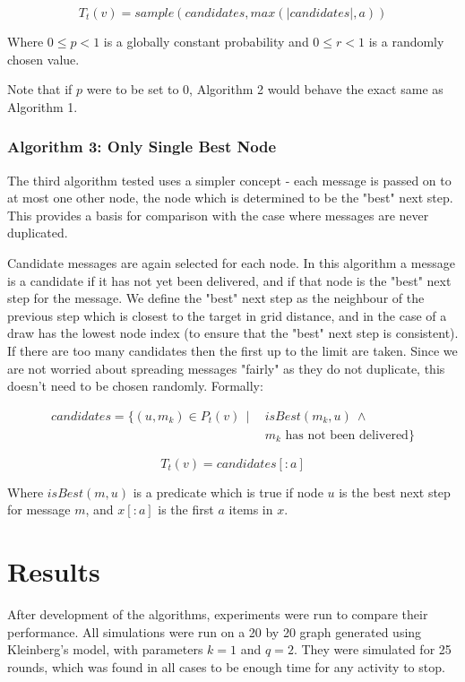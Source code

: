 \documentclass[bsc,frontabs,twoside,singlespacing,parskip,deptreport]{infthesis}     %
\begin{document}
\begin{equation}
T_{t}(v) = sample(candidates, max(|candidates|, a))
\end{equation}

Where $0 \leq p < 1$ is a globally constant probability and $0 \leq r < 1$ is a randomly chosen value.

Note that if $p$ were to be set to 0, Algorithm 2 would behave the exact same as Algorithm 1.

\subsection{Algorithm 3: Only Single Best Node}
The third algorithm tested uses a simpler concept - each message is passed on to at most one other node, the node which is determined to be the "best" next step. This provides a basis for comparison with the case where messages are never duplicated.

Candidate messages are again selected for each node. In this algorithm a message is a candidate if it has not yet been delivered, and if that node is the "best" next step for the message. We define the "best" next step as the neighbour of the previous step which is closest to the target in grid distance, and in the case of a draw has the lowest node index (to ensure that the "best" next step is consistent). If there are too many candidates then the first up to the limit are taken. Since we are not worried about spreading messages "fairly" as they do not duplicate, this doesn't need to be chosen randomly. Formally:

\begin{equation}
\begin{split}
candidates = \{ (u, m_{k}) \in P_{t}(v) \:\: | \:\: & isBest(m_{k}, u) \: \wedge \\
& m_{k} \mbox{ has not been delivered} \}
\end{split}
\end{equation}

\begin{equation}
T_{t}(v) = candidates[:a]
\end{equation}

Where $isBest(m, u)$ is a predicate which is true if node $u$ is the best next step for message $m$, and $x[:a]$ is the first $a$ items in $x$.


\chapter{Results}
After development of the algorithms, experiments were run to compare their performance. All simulations were run on a 20 by 20 graph generated using Kleinberg's model, with parameters $k = 1$ and $q = 2$. They were simulated for 25 rounds, which was found in all cases to be enough time for any activity to stop. 
\end{document}

